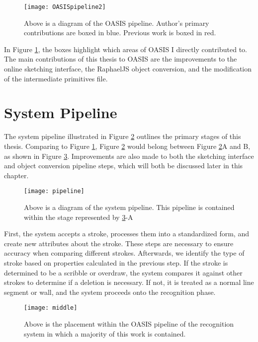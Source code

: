 \begin{figure}[ht]
\centering
\texttt{[image: OASISpipeline2]}
\caption[OASIS pipeline diagram]{Above is a diagram of the OASIS pipeline. Author's primary contributions are boxed in blue. Previous work is boxed in red.}
\label{fig:oasispipeline}
\end{figure}

In Figure \ref{fig:oasispipeline}, the boxes highlight which areas of OASIS I directly contributed to. The main contributions of this thesis to OASIS are the improvements to the online sketching interface, the RaphaelJS object conversion, and the modification of the intermediate primitives file. \\

\section{System Pipeline}
The system pipeline illustrated in Figure \ref{fig:systempipeline} outlines the primary stages of this thesis. Comparing to Figure \ref{fig:oasispipeline}, Figure \ref{fig:systempipeline} would belong between Figure \ref{fig:systempipeline}A and B, as shown in Figure \ref{fig:middlepipeline}. Improvements are also made to both the sketching interface and object conversion pipeline steps, which will both be discussed later in this chapter.

\begin{figure}[ht]
\centering
\texttt{[image: pipeline]}
\caption[Sketching interface system pipeline diagram]{Above is a diagram of the system pipeline. This pipeline is contained within the stage represented by \ref{fig:middlepipeline}-A}
\label{fig:systempipeline}
\end{figure}

First, the system accepts a stroke, processes them into a standardized form, and create new attributes about the stroke. These steps are necessary to ensure accuracy when comparing different strokes. Afterwards, we identify the type of stroke based on properties calculated in the previous step. If the stroke is determined to be a scribble or overdraw, the system compares it against other strokes to determine if a deletion is necessary. If not, it is treated as a normal line segment or wall, and the system proceeds onto the recognition phase.  \\

\begin{figure}[ht]
\centering
\texttt{[image: middle]}
\caption[System pipeline diagram]{Above is the placement within the OASIS pipeline of the recognition system in which a majority of this work is contained.}
\label{fig:middlepipeline}
\end{figure}

